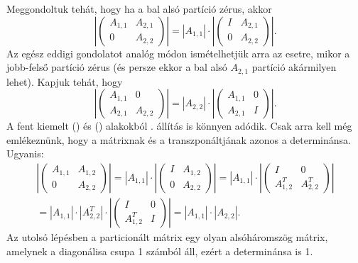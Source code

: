 \documentclass[a4paper, showtrims]{memoir}
\theoremstyle{plain}
\theoremstyle{remark}
\theoremstyle{definition}
\begin{document}
Meggondoltuk tehát, hogy ha a bal alsó partíció zérus, akkor
\[
    \left|
    \begin{pmatrix}
        A_{1,1}&A_{2,1}\\
        0&A_{2,2}
    \end{pmatrix}
    \right|
    =
    |A_{1,1}|\cdot
    \left|
    \begin{pmatrix}
        I&A_{2,1}\\
        0&A_{2,2}
    \end{pmatrix}
    \right|.\tag{\dag}
\]
Az egész eddigi gondolatot analóg módon ismételhetjük arra az esetre, 
mikor a jobb-felső partíció zérus (és persze ekkor a bal alsó $A_{2,1}$ partíció akármilyen lehet).
Kapjuk tehát, hogy
\[
    \left|
    \begin{pmatrix}
        A_{1,1}&0\\
        A_{2,1}&A_{2,2}
    \end{pmatrix}
    \right|
    =
    |A_{2,2}|\cdot
    \left|
    \begin{pmatrix}
        A_{1,1}&0\\
        A_{2,1}&I
    \end{pmatrix}
    \right|.\tag{\ddag}
\]
A fent kiemelt (\dag) és (\ddag) alakokból . állítás is könnyen adódik.
Csak arra kell még emlékeznünk, hogy a mátrixnak és a transzponáltjának azonos a determinánsa.
Ugyanis:
\begin{multline*}
    \left|
    \begin{pmatrix}
        A_{1,1}&A_{1,2}\\
        0&A_{2,2}
    \end{pmatrix}
    \right|
    =
    |A_{1,1}|\cdot
    \left|
    \begin{pmatrix}
        I&A_{1,2}\\
        0&A_{2,2}
    \end{pmatrix}
    \right|
    =
    |A_{1,1}|\cdot
    \left|
    \begin{pmatrix}
        I&0\\
        A_{1,2}^T&A_{2,2}^T
    \end{pmatrix}
    \right|
    \\
    =
    |A_{1,1}|\cdot |A_{2,2}^T|\cdot
    \left|
    \begin{pmatrix}
        I&0\\
        A_{1,2}^T&I
    \end{pmatrix}
    \right|
    =
    |A_{1,1}|\cdot |A_{2,2}|.
\end{multline*}
Az utolsó lépésben a particionált mátrix egy olyan alsóháromszög mátrix, amelynek a diagonálisa csupa 1 számból áll, ezért a determinánsa is 1.
\end{document}
